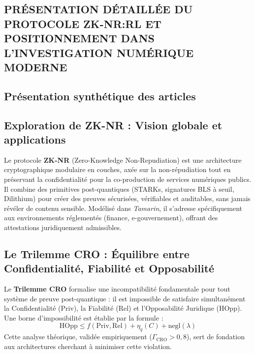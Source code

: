 \documentclass[12pt]{article}
\begin{document}
\begin{center}
\section{ PRÉSENTATION DÉTAILLÉE DU PROTOCOLE ZK-NR:RL ET
 POSITIONNEMENT DANS L’INVESTIGATION NUMÉRIQUE MODERNE}
 
\subsection*{Présentation synthétique des articles}

\subsection{Exploration de ZK-NR : Vision globale et applications}
Le protocole \textbf{ZK-NR} (Zero-Knowledge Non-Repudiation) est une architecture cryptographique modulaire en couches, axée sur la non-répudiation tout en préservant la confidentialité pour la co-production de services numériques publics. Il combine des primitives post-quantiques (STARKs, signatures BLS à seuil, Dilithium) pour créer des preuves sécurisées, vérifiables et auditables, sans jamais révéler de contenu sensible. Modélisé dans \textit{Tamarin}, il s’adresse spécifiquement aux environnements réglementés (finance, e-gouvernement), offrant des attestations juridiquement admissibles.

\subsection{Le Trilemme CRO : Équilibre entre Confidentialité, Fiabilité et Opposabilité}
Le \textbf{Trilemme CRO} formalise une incompatibilité fondamentale pour tout système de preuve post-quantique : il est impossible de satisfaire simultanément la Confidentialité (Priv), la Fiabilité (Rel) et l’Opposabilité Juridique (HOpp). Une borne d’impossibilité est établie par la formule :
\[
\text{HOpp} \le f(\text{Priv}, \text{Rel}) + \eta_q(C) + \text{negl}(\lambda)
\]
Cette analyse théorique, validée empiriquement (\(\Gamma_{\text{CRO}} > 0,8\)), sert de fondation aux architectures cherchant à minimiser cette violation.


\end{center}
\end{document}
